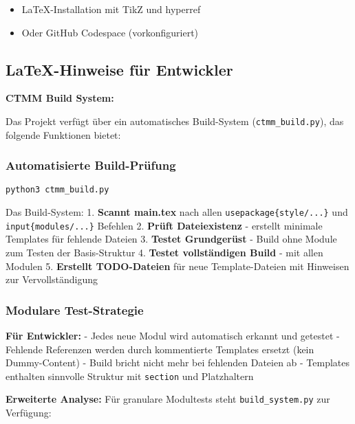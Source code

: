 \begin{itemize}
\tightlist
\item
  LaTeX-Installation mit TikZ und hyperref
\item
  Oder GitHub Codespace (vorkonfiguriert)
\end{itemize}

\hypertarget{latex-hinweise-fuxfcr-entwickler}{%
\subsection{LaTeX-Hinweise für Entwickler}\label{latex-hinweise-fuxfcr-entwickler}}

\textbf{CTMM Build System:}

Das Projekt verfügt über ein automatisches Build-System (\texttt{ctmm\_build.py}), das folgende Funktionen bietet:

\hypertarget{automatisierte-build-pruxfcfung}{%
\subsubsection{Automatisierte Build-Prüfung}\label{automatisierte-build-pruxfcfung}}

\begin{verbatim}
python3 ctmm_build.py
\end{verbatim}

Das Build-System: 1. \textbf{Scannt main.tex} nach allen \texttt{usepackage\{style/...\}} und \texttt{input\{modules/...\}} Befehlen 2. \textbf{Prüft Dateiexistenz} - erstellt minimale Templates für fehlende Dateien 3. \textbf{Testet Grundgerüst} - Build ohne Module zum Testen der Basis-Struktur 4. \textbf{Testet vollständigen Build} - mit allen Modulen 5. \textbf{Erstellt TODO-Dateien} für neue Template-Dateien mit Hinweisen zur Vervollständigung

\hypertarget{modulare-test-strategie}{%
\subsubsection{Modulare Test-Strategie}\label{modulare-test-strategie}}

\textbf{Für Entwickler:} - Jedes neue Modul wird automatisch erkannt und getestet - Fehlende Referenzen werden durch kommentierte Templates ersetzt (kein Dummy-Content) - Build bricht nicht mehr bei fehlenden Dateien ab - Templates enthalten sinnvolle Struktur mit \texttt{section} und Platzhaltern

\textbf{Erweiterte Analyse:} Für granulare Modultests steht \texttt{build\_system.py} zur Verfügung:

